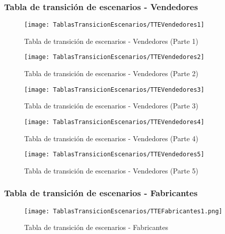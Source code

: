 \subsubsection{Tabla de transición de escenarios - Vendedores}
    \begin{figure}[H]
        \centering
        \texttt{[image: TablasTransicionEscenarios/TTEVendedores1]}
        \caption{Tabla de transición de escenarios - Vendedores (Parte 1)}
    \label{fig:TTEVendedores1}
    \end{figure}
    \begin{figure}[H]
        \centering
        \texttt{[image: TablasTransicionEscenarios/TTEVendedores2]}
        \caption{Tabla de transición de escenarios - Vendedores (Parte 2)}
    \label{fig:TTEVendedores2}
    \end{figure}
    \begin{figure}[H]
        \centering
        \texttt{[image: TablasTransicionEscenarios/TTEVendedores3]}
        \caption{Tabla de transición de escenarios - Vendedores (Parte 3)}
    \label{fig:TTEVendedores3}
    \end{figure}
    \begin{figure}[H]
        \centering
        \texttt{[image: TablasTransicionEscenarios/TTEVendedores4]}
        \caption{Tabla de transición de escenarios - Vendedores (Parte 4)}
    \label{fig:TTEVendedores4}
    \end{figure}
    \begin{figure}[H]
        \centering
        \texttt{[image: TablasTransicionEscenarios/TTEVendedores5]}
        \caption{Tabla de transición de escenarios - Vendedores (Parte 5)}
    \label{fig:TTEVendedores5}
    \end{figure}
\subsubsection{Tabla de transición de escenarios - Fabricantes}
    \begin{figure}[H]
        \centering
        \texttt{[image: TablasTransicionEscenarios/TTEFabricantes1.png]}
        \caption{Tabla de transición de escenarios - Fabricantes}
    \label{fig:TTEFabricantes}
    \end{figure}